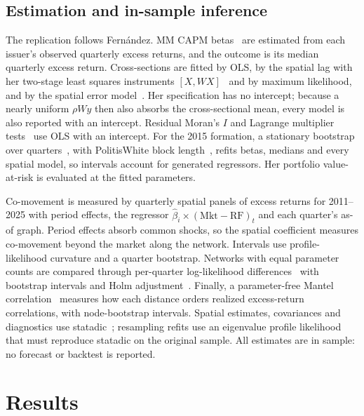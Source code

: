 \documentclass[11pt]{article}
\begin{document}
\subsection{Estimation and in-sample inference}
The replication follows Fern\'andez. MM CAPM betas~\cite{yohai1987}
are estimated
from each issuer's observed quarterly excess returns, and the outcome
is its median
quarterly excess return. Cross-sections are fitted by OLS, by the
spatial lag with
her two-stage least squares instruments $[X,WX]$~\cite{kelejian1998}
and by maximum
likelihood, and by the spatial error model~\cite{anselin1988}. Her
specification has
no intercept; because a nearly uniform $\rho Wy$ then also absorbs the
cross-sectional mean, every model is also reported with an intercept. Residual
Moran's $I$ and Lagrange multiplier tests~\cite{anselin1996} use OLS with an
intercept. For the 2015 formation, a stationary bootstrap over
quarters~\cite{politis1994}, with Politis\textendash{}White block
length~\cite{politis2004,patton2009}, refits betas, medians and every
spatial model,
so intervals account for generated regressors. Her portfolio value-at-risk is
evaluated at the fitted parameters.

Co-movement is measured by quarterly spatial panels of excess returns for
2011--2025 with period effects, the regressor
$\hat\beta_i\times{(\text{Mkt}-\text{RF})}_t$
and each quarter's as-of graph. Period effects absorb common shocks,
so the spatial
coefficient measures co-movement beyond the market along the network. Intervals
use profile-likelihood curvature and a quarter bootstrap. Networks with equal
parameter counts are compared through per-quarter log-likelihood
differences~\cite{vuong1989} with bootstrap intervals and Holm
adjustment~\cite{holm1979}. Finally, a parameter-free Mantel
correlation~\cite{mantel1967} measures how each distance orders realized
excess-return correlations, with node-bootstrap intervals. Spatial estimates,
covariances and diagnostics use statadic~\cite{statadic2026};
resampling refits use
an eigenvalue profile likelihood that must reproduce statadic on the original
sample. All estimates are in sample: no forecast or backtest is reported.

\section{Results}\label{sec:results}
\end{document}
